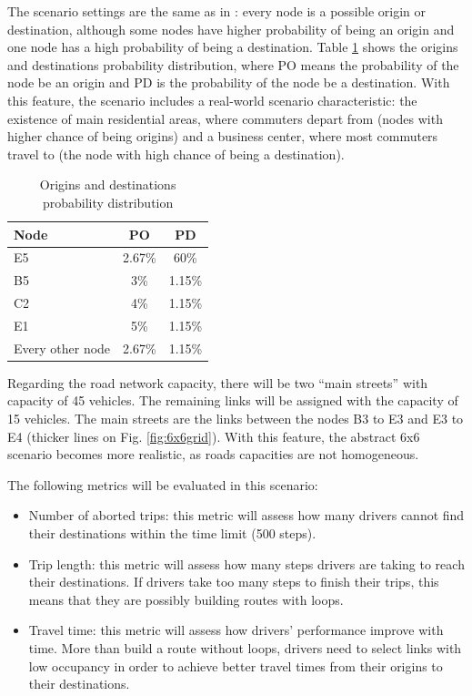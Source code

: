 \documentclass{RITA}
\begin{document}
The scenario settings are the same as in \cite{Bazzan+2008alamas}: every node is a possible origin or destination, although some nodes have higher probability of being an origin and one node has a high probability of being a destination. Table \ref{tab:odprob} shows the origins and destinations probability distribution, where PO means the probability of the node be an origin and PD is the probability of the node be a destination. With this feature, the scenario includes a real-world scenario characteristic: the existence of main residential areas, where commuters depart from (nodes with higher chance of being origins) and a business center, where most commuters travel to (the node with high chance of being a destination).

{%
\begin{table}[ht]
\begin{center}
\begin{tabular}{|l|c|c|} \hline
Node & PO & PD \\ \hline
E5 & 2.67\% & 60\% \\ \hline
B5 & 3\% & 1.15\% \\ \hline
C2 & 4\% & 1.15\% \\ \hline
E1 & 5\% & 1.15\% \\ \hline
Every other node & 2.67\% & 1.15\% \\ \hline
\end{tabular}
\caption{Origins and destinations probability distribution}\label{tab:odprob}
\end{center}
\end{table}
}%
Regarding the road network capacity, there will be two ``main streets'' with capacity of 45 vehicles. The remaining links will be assigned with the capacity of 15 vehicles. The main streets are the links between the nodes B3 to E3 and E3 to E4 (thicker lines on Fig. \ref{fig:6x6grid}). With this feature, the abstract 6x6 scenario becomes more realistic, as roads capacities are not homogeneous.

The following metrics will be evaluated in this scenario:

\begin{itemize}
  \item Number of aborted trips: this metric will assess how many drivers cannot find their destinations within the time limit (500 steps).
  \item Trip length: this metric will assess how many steps drivers are taking to reach their destinations. If drivers take too many steps to finish their trips, this means that they are possibly building routes with loops.
 \item Travel time: this metric will assess how drivers' performance improve with time. More than build a route without loops, drivers need to select links with low occupancy in order to achieve better travel times from their origins to their destinations.
\end{itemize}
\end{document}
